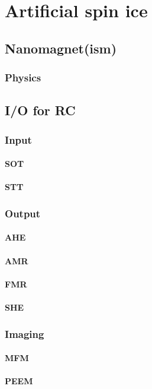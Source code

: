 \section{Artificial spin ice}\label{sec:1:ASI} %
\subsection{Nanomagnet(ism)}
\subsubsection{Physics} %
\subsection{I/O for RC}\label{sec:1:ASI_IO}
\subsubsection{Input}
\paragraph{SOT}
\cite{SOT_FM_AFM,SOTswitchingCoPt,SOT_Roadmap,vlasov2022optimal}
\paragraph{STT} %
\subsubsection{Output}
\paragraph{AHE}
\cite{AHE,AHE_Culcer}
\paragraph{AMR} %
\paragraph{FMR} %
\paragraph{SHE} %
\cite{SHE}
\subsubsection{Imaging} %
\paragraph{MFM}
\paragraph{PEEM}

